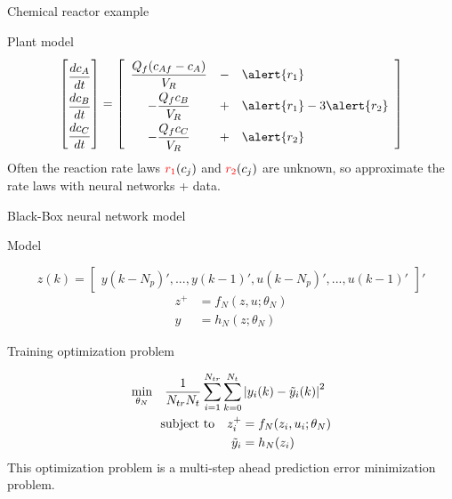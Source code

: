 \documentclass[xcolor=dvipsnames, 8pt]{beamer} %
\begin{document}
\begin{frame}{Chemical reactor example}
		
		\centerline{\resizebox{0.7\textwidth}{!}{}}
		\pause
		\begin{block}{Plant model}
			\begin{equation*}
				\renewcommand{\arraystretch}{2}
				\begin{bmatrix} 
					\dfrac{dc_A}{dt} \\
					\dfrac{dc_B}{dt} \\
					\dfrac{dc_C}{dt}
				\end{bmatrix} = \begin{bmatrix}
					\begin{array}{ccl}
						\dfrac{Q_f(c_{Af} - c_A)}{V_R} &-& \alert{r_1} 
						\\ 
						-\dfrac{Q_fc_B}{V_R} &+& \alert{r_1} - 3\alert{r_2} \\
						-\dfrac{Q_fc_C}{V_R} &+& \alert{r_2}
					\end{array}
				\end{bmatrix}
			\end{equation*}
			Often the reaction rate laws
			${\color{red}r_1}(c_j)$ and ${\color{red} r_2}(c_j)$ are unknown,
			so approximate the rate laws with neural networks + data.
		\end{block}
\end{frame}

\begin{frame}{Black-Box neural network model}

	\begin{block}{Model}
	
	\begin{equation*}
		z(k) = \begin{bmatrix} y(k-N_p)', ..., y(k-1)',
							   u(k-N_p)', ..., u(k-1)' 
			   \end{bmatrix}'
	\end{equation*}
	\begin{align*}
		z^+ &= f_N(z, u;\theta_N) \\ 
		y &= h_N(z;\theta_N)
	\end{align*}
	\end{block}
	\pause
	\begin{block}{Training optimization problem}
		
	\begin{align*}
		\underset{\theta_N}{\textnormal{min}} \quad \dfrac{1}{N_{tr} 
		N_t} \sum_{i=1}^{N_{tr}}
		\sum_{k=0}^{N_t} & \left| y_i(k) - \tilde{y}_i(k) \right|^2 \\ 
		\textnormal{subject to} \quad z_i^+ & = f_N(z_i, u_i;\theta_N) \\
								  \tilde{y}_i &= h_N(z_i)
	\end{align*}
	This optimization problem is a multi-step ahead prediction error 
	minimization problem.	
	\end{block}

\end{frame}
\end{document}
